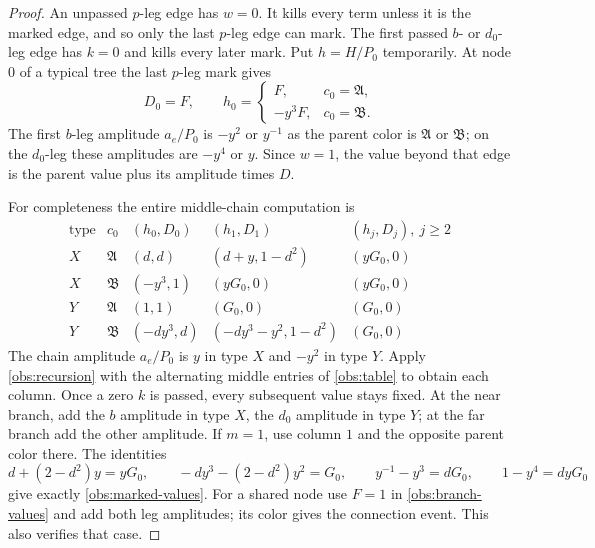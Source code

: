 \begin{proof}
An unpassed $p$-leg edge has $w=0$.  It kills every term unless it
is the marked edge, and so only the last $p$-leg edge can mark.
The first passed $b$- or $d_0$-leg edge has $k=0$ and kills every
later mark.  Put $h=H/P_0$ temporarily.  At node $0$ of a typical
tree the last $p$-leg mark gives
\begin{equation}
 D_0=F,\qquad h_0=
 \begin{cases}F,&c_0=\mathfrak A,\\-y^3F,&c_0=\mathfrak B.
 \end{cases}
 \label{obs:branch-values}
\end{equation}
The first $b$-leg amplitude $a_e/P_0$ is $-y^2$ or $y^{-1}$ as
the parent color is $\mathfrak A$ or $\mathfrak B$; on the $d_0$-leg
these amplitudes are $-y^4$ or $y$.  Since $w=1$, the value beyond
that edge is the parent value plus its amplitude times $D$.

For completeness the entire middle-chain computation is
\begin{equation}
 \begin{array}{c|c|c|c|c}
 \text{type}&c_0&(h_0,D_0)&(h_1,D_1)&(h_j,D_j),\ j\ge2\\ \hline
 X&\mathfrak A&(d,d)&(d+y,1-d^2)&(yG_0,0)\\
 X&\mathfrak B&(-y^3,1)&(yG_0,0)&(yG_0,0)\\
 Y&\mathfrak A&(1,1)&(G_0,0)&(G_0,0)\\
 Y&\mathfrak B&(-dy^3,d)&(-dy^3-y^2,1-d^2)&(G_0,0)
 \end{array}
 \label{obs:chain-evaluation}
\end{equation}
The chain amplitude $a_e/P_0$ is $y$ in type $X$ and $-y^2$ in
type $Y$.  Apply \eqref{obs:recursion} with the alternating middle
entries of \eqref{obs:table} to obtain each column.  Once a zero
$k$ is passed, every subsequent value stays fixed.  At the near
branch, add the $b$ amplitude in type $X$, the $d_0$ amplitude in
type $Y$; at the far branch add the other amplitude.  If $m=1$, use
column $1$ and the opposite parent color there.  The identities
\begin{equation}
 d+(2-d^2)y=yG_0,\qquad
 -dy^3-(2-d^2)y^2=G_0,
 \qquad y^{-1}-y^3=dG_0,\qquad 1-y^4=dyG_0
 \label{obs:far-identities}
\end{equation}
give exactly \eqref{obs:marked-values}.  For a shared node use
$F=1$ in \eqref{obs:branch-values} and add both leg amplitudes;
its color gives the connection event.  This also verifies that case.


\end{proof}
